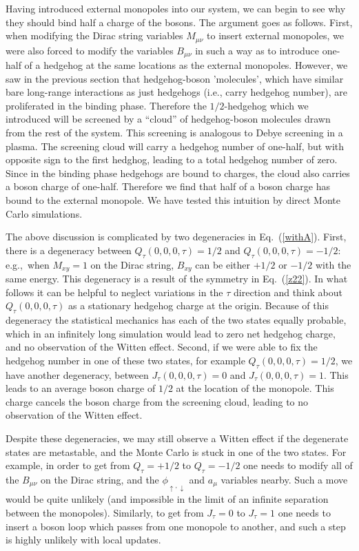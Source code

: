 Having introduced external monopoles into our system, we can begin to see why they should bind half a charge of the bosons. 
The argument goes as follows. First, when modifying the Dirac string variables $M_{\mu\nu}$ to insert external monopoles, we were also forced to modify the variables $B_{\mu\nu}$ in such a way as to introduce one-half of a hedgehog at the same locations as the external monopoles. However, we saw in the previous section that hedgehog-boson 'molecules', which have similar bare long-range interactions as just hedgehogs (i.e., carry hedgehog number), are proliferated in the binding phase. Therefore the $1/2$-hedgehog which we introduced will be screened by a ``cloud'' of hedgehog-boson molecules drawn from the rest of the system. This screening is analogous to Debye screening in a plasma. The screening cloud will carry a hedgehog number of one-half, but with opposite sign to the first hedghog, leading to a total hedgehog number of zero. Since in the binding phase hedgehogs are bound to charges, the cloud also carries a boson charge of one-half. Therefore we find that half of a boson charge has bound to the external monopole. We have tested this intuition by direct Monte Carlo simulations.

The above discussion is complicated by two degeneracies in Eq.~(\ref{withA}). First, there is a degeneracy between $Q_\tau(0,0,0,\tau)=1/2$ and $Q_\tau(0,0,0,\tau)=-1/2$: e.g.,~when $M_{xy}=1$ on the Dirac string, $B_{xy}$ can be either $+1/2$ or $-1/2$ with the same energy. This degeneracy is a result of the symmetry in Eq.~(\ref{z22}). In what follows it can be helpful to neglect variations in the $\tau$ direction and think about $Q_\tau(0,0,0,\tau)$ as a stationary hedgehog charge at the origin. Because of this degeneracy the statistical mechanics has each of the two states equally probable, which in an infinitely long simulation would lead to zero net hedgehog charge, and no observation of the Witten effect.
Second, if we were able to fix the hedgehog number in one of these two states, for example $Q_\tau(0,0,0,\tau) = 1/2$, we have another degeneracy, between $J_\tau(0,0,0,\tau) = 0$ and $J_\tau(0,0,0,\tau) = 1$. This leads to an average boson charge of $1/2$ at the location of the  monopole. This charge cancels the boson charge from the screening cloud, leading to no observation of the Witten effect. 

Despite these degeneracies, we may still observe a Witten effect if the degenerate states are metastable, and the Monte Carlo is stuck in one of the two states. For example, in order to get from $Q_\tau=+1/2$ to $Q_\tau=-1/2$ one needs to modify all of the $B_{\mu\nu}$ on the Dirac string, and the $\phi_{\uparrow,\downarrow}$ and $a_{\mu}$ variables nearby. Such a move would be quite unlikely (and impossible in the limit of an infinite separation between the monopoles). Similarly, to get from $J_\tau=0$ to $J_\tau=1$ one needs to insert a boson loop which passes from one monopole to another, and such a step is highly unlikely with local updates.

